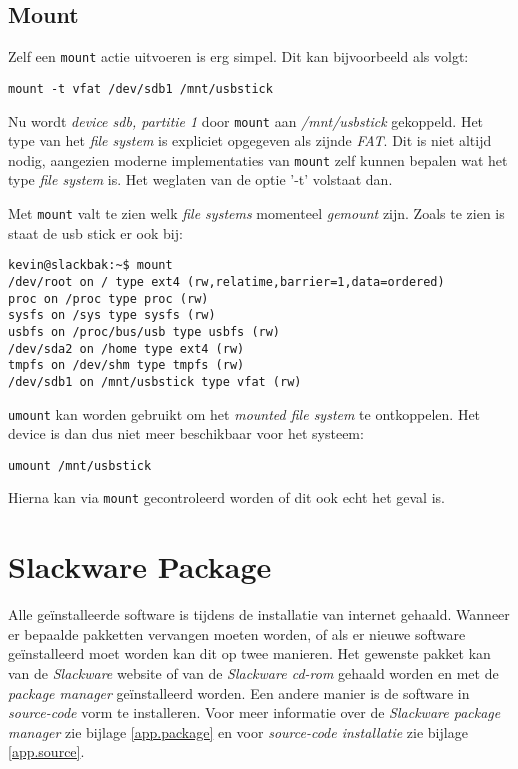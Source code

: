 \subsection{Mount}

Zelf een \texttt{mount} actie uitvoeren is erg simpel. Dit kan bijvoorbeeld als volgt: 
\begin{lstlisting}
mount -t vfat /dev/sdb1 /mnt/usbstick
\end{lstlisting}
Nu wordt \emph{device sdb, partitie 1} door \texttt{mount} aan \emph{/mnt/usbstick} gekoppeld. Het type van het \emph{file system} is expliciet opgegeven als zijnde \emph{FAT}. Dit is niet altijd nodig, aangezien moderne implementaties van \texttt{mount} zelf kunnen bepalen wat het type \emph{file system} is. Het weglaten van de optie '-t' volstaat dan. 

Met \texttt{mount} valt te zien welk \emph{file systems} momenteel \emph{gemount} zijn. Zoals te zien is staat de usb stick er ook bij:
\begin{lstlisting}
kevin@slackbak:~$ mount
/dev/root on / type ext4 (rw,relatime,barrier=1,data=ordered)
proc on /proc type proc (rw)
sysfs on /sys type sysfs (rw)
usbfs on /proc/bus/usb type usbfs (rw)
/dev/sda2 on /home type ext4 (rw)
tmpfs on /dev/shm type tmpfs (rw)
/dev/sdb1 on /mnt/usbstick type vfat (rw)
\end{lstlisting}%
\texttt{umount} kan worden gebruikt om het \emph{mounted file system} te ontkoppelen. Het device is dan dus niet meer beschikbaar voor het systeem: 
\begin{lstlisting}
umount /mnt/usbstick
\end{lstlisting}
Hierna kan via \texttt{mount} gecontroleerd worden of dit ook echt het geval is.

\section{Slackware Package}
Alle ge\"{i}nstalleerde software is tijdens de installatie van internet gehaald. Wanneer er bepaalde pakketten vervangen moeten worden, of als er nieuwe software ge\"{i}nstalleerd moet worden kan dit op twee manieren. Het gewenste pakket kan van de \emph{Slackware} website of van de \emph{Slackware cd-rom} gehaald worden en met de \emph{package manager} ge\"{i}nstalleerd worden. Een andere manier is de software in \emph{source-code} vorm te installeren. Voor meer informatie over de \emph{Slackware package manager} zie bijlage \ref{app.package} en voor \emph{source-code installatie} zie bijlage \ref{app.source}.

